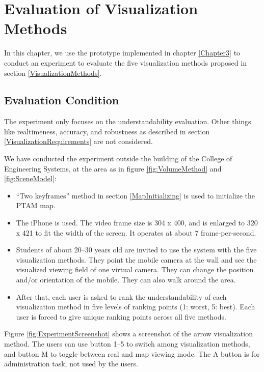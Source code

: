 \chapter{Evaluation of Visualization Methods}
\label{Chapter4}

In this chapter, we use the prototype implemented in chapter \ref{Chapter3} to conduct an experiment to evaluate the five visualization methods proposed in section \ref{VisualizationMethods}.


\section{Evaluation Condition}

The experiment only focuses on the understandability evaluation. Other things like realtimeness, accuracy, and robustness as described in section \ref{VisualizationRequirements} are not considered.

We have conducted the experiment outside the building of the College of Engineering Systems, at the area as in figure \ref{fig:VolumeMethod} and \ref{fig:SceneModel}:

\begin{itemize}
	\item ``Two keyframes'' method in section \ref{MapInitializing} is used to initialize the PTAM map.
	\item The iPhone is used. The video frame size is 304 x 400, and is enlarged to 320 x 421 to fit the width of the screen. It operates at about 7 frame-per-second.
	\item Students of about 20--30 years old are invited to use the system with the five visualization methods. They point the mobile camera at the wall and see the visualized viewing field of one virtual camera. They can change the position and/or orientation of the mobile. They can also walk around the area.
	\item After that, each user is asked to rank the understandability of each visualization method in five levels of ranking points (1: worst, 5: best). Each user is forced to give unique ranking points across all five methods.
\end{itemize}

Figure \ref{fig:ExperimentScreenshot} shows a screenshot of the arrow visualization method. The users can use button 1--5 to switch among visualization methods, and button M to toggle between real and map viewing mode. The A button is for administration task, not used by the users.

